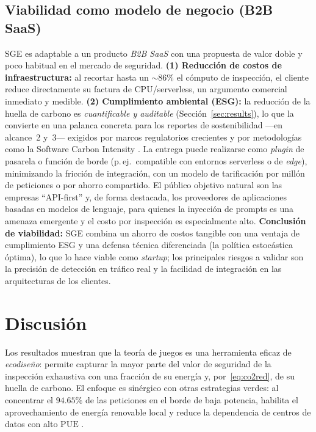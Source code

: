 \documentclass[10pt,twocolumn]{article}
\begin{document}
\subsection{Viabilidad como modelo de negocio (B2B SaaS)}
SGE es adaptable a un producto \emph{B2B SaaS} con una propuesta de valor doble y poco
habitual en el mercado de seguridad. \textbf{(1) Reducci\'on de costos de
infraestructura:} al recortar hasta un $\sim\!86\%$ el c\'omputo de inspecci\'on, el
cliente reduce directamente su factura de CPU/serverless, un argumento comercial
inmediato y medible. \textbf{(2) Cumplimiento ambiental (ESG):} la reducci\'on de la
huella de carbono es \emph{cuantificable y auditable} (Secci\'on~\ref{sec:results}),
lo que la convierte en una palanca concreta para los reportes de sostenibilidad ---en
alcance~2 y~3--- exigidos por marcos regulatorios crecientes y por metodolog\'ias como
la Software Carbon Intensity \cite{gsf}. La entrega puede realizarse como \emph{plugin}
de pasarela o funci\'on de borde (p.\,ej.\ compatible con entornos serverless o de
\emph{edge}), minimizando la fricci\'on de integraci\'on, con un modelo de tarificaci\'on
por mill\'on de peticiones o por ahorro compartido. El p\'ublico objetivo natural son las
empresas ``API-first'' y, de forma destacada, los proveedores de aplicaciones basadas
en modelos de lenguaje, para quienes la inyecci\'on de prompts es una amenaza emergente y
el costo por inspecci\'on es especialmente alto. \textbf{Conclusi\'on de viabilidad:}
SGE combina un ahorro de costos tangible con una ventaja de cumplimiento ESG y una
defensa t\'ecnica diferenciada (la pol\'itica estoc\'astica \'optima), lo que lo hace
viable como \emph{startup}; los principales riesgos a validar son la precisi\'on de
detecci\'on en tr\'afico real y la facilidad de integraci\'on en las arquitecturas de los
clientes.

\section{Discusi\'on}
\label{sec:discussion}
Los resultados muestran que la teor\'ia de juegos es una herramienta eficaz de
\emph{ecodise\~no}: permite capturar la mayor parte del valor de seguridad de la
inspecci\'on exhaustiva con una fracci\'on de su energ\'ia y, por~\eqref{eq:co2red}, de
su huella de carbono. El enfoque es sin\'ergico con otras estrategias verdes: al
concentrar el $94.65\%$ de las peticiones en el borde de baja potencia, habilita el
aprovechamiento de energ\'ia renovable local y reduce la dependencia de centros de
datos con alto $\mathrm{PUE}$ \cite{radu,masanet}.
\end{document}
